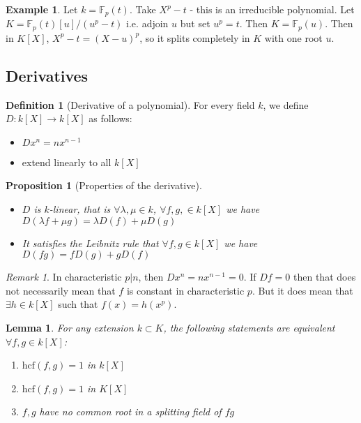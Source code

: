 \documentclass{article}
\theoremstyle{definition}
\newtheorem{defn}{Definition}[section]
\newtheorem{exmp}{Example}[section]
\theoremstyle{plain}%
\newtheorem{lem}[thm]{Lemma}
\newtheorem{prop}[thm]{Proposition}
\theoremstyle{remark}
\newtheorem*{rem}{Remark}
\begin{document}
\begin{exmp}
    Let $k = \mathbb{F}_p(t)$. Take $X^p - t$ - this is an irreducible polynomial. Let $K = \mathbb{F}_p(t)[u]/(u^p - t)$ i.e. adjoin $u$ but set $u^p = t$. Then $K = \mathbb{F}_p(u)$. Then in $K[X]$, $X^p - t = (X-u)^p$, so it splits completely in $K$ with one root $u$. 
\end{exmp}

\subsection{Derivatives}



\begin{defn}[Derivative of a polynomial]
    For every field $k$, we define $D : k[X] \to k[X]$ as follows:
\begin{itemize}
    \item $Dx^n = nx^{n-1}$
    \item extend linearly to all $k[X]$
\end{itemize}
\end{defn}

\begin{prop}[Properties of the derivative]
\hspace{0.1em}
    \begin{itemize}
    \item $D$ is $k$-linear, that is $\forall \lambda, \mu \in k$, $\forall f,g, \in k[X]$ we have $D(\lambda f + \mu g) = \lambda D(f) + \mu D(g)$
    \item It satisfies the Leibnitz rule that $\forall f,g \in k[X]$ we have $D(fg) = fD(g) + gD(f)$
    \end{itemize}
\end{prop}

\begin{rem}
    In characteristic $p | n$, then $Dx^n = nx^{n-1} = 0$. If $Df = 0$ then that does not necessarily mean that $f$ is constant in characteristic $p$. But it does mean that $\exists h \in k[X]$ such that $f(x) = h(x^p)$.
\end{rem}

\begin{lem}
    For any extension $k \subset K$, the following statements are equivalent $\forall f,g \in k[X]$:
    \begin{enumerate}
        \item $\text{hcf}(f,g) = 1$ in $k[X]$
        \item $\text{hcf}(f,g) = 1$ in $K[X]$
        \item $f,g$ have no common root in a splitting field of $fg$
    \end{enumerate}
\end{lem}
\end{document}
